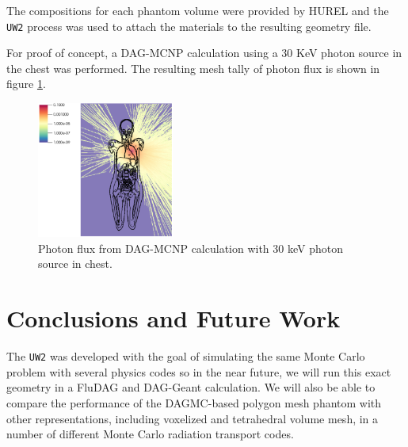 \documentclass{anstrans}
\begin{document}
The compositions for each phantom volume were provided by HUREL and the \texttt{UW2} 
process was used to attach the materials to the resulting
geometry file.



For proof of concept, a DAG-MCNP calculation using a 30 KeV photon
source in the chest was performed.  The resulting mesh tally of photon flux is 
shown in figure \ref{fig:mcnp}. 

\begin{figure}[ht] %
  \centering
  \includegraphics[width=0.4\textwidth]{../figs/30KeV_Psource.png}
  \caption{Photon flux from DAG-MCNP calculation with 30 keV photon source in chest. }
  \label{fig:mcnp}
\end{figure}


\section{Conclusions and Future Work}

The \texttt{UW2} was developed with the goal of simulating the same Monte
Carlo problem with several physics codes so in the near future, we will run
this exact geometry in a FluDAG and DAG-Geant calculation. We will also be
able to compare the performance of the DAGMC-based polygon mesh phantom with
other representations, including voxelized and tetrahedral volume mesh, in a
number of different Monte Carlo radiation transport codes.
\end{document}
